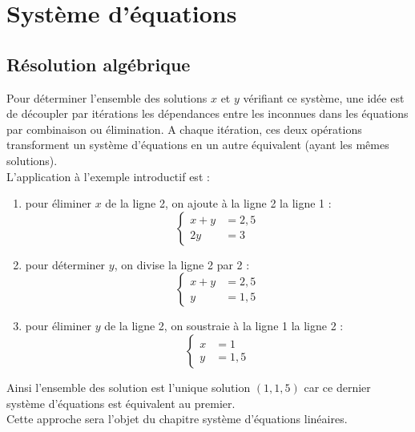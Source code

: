 \documentclass{book}
\begin{document}
\section{Système d'équations}

\subsection{Résolution algébrique}
Pour déterminer l'ensemble des solutions $x$ et $y$ vérifiant ce système, une idée est de découpler par itérations les dépendances entre les inconnues dans les équations par combinaison ou élimination. A chaque itération, ces deux opérations transforment  un système d'équations en un autre équivalent (ayant les mêmes solutions).\\
L'application à l'exemple introductif est :
\begin{enumerate}
\item pour éliminer $x$ de la ligne 2,  on ajoute à la ligne 2 la ligne 1 :
$$\begin{cases}
x+y&=2,5\\
2y&=3
\end{cases}
$$
\item pour déterminer $y$, on divise la ligne 2 par 2 : 
$$\begin{cases}
x+y&=2,5\\
y&=1,5
\end{cases}
$$
\item pour éliminer $y$  de la ligne 2, on soustraie à la ligne 1 la ligne 2 :
$$\begin{cases}
x&=1\\
y&=1,5
\end{cases}
$$
\end{enumerate}
Ainsi l'ensemble des solution est l'unique solution $(1 , 1,5 )$ car ce dernier système d'équations est équivalent au premier.\\
Cette approche sera l'objet du chapitre système d'équations linéaires. 
\end{document}
